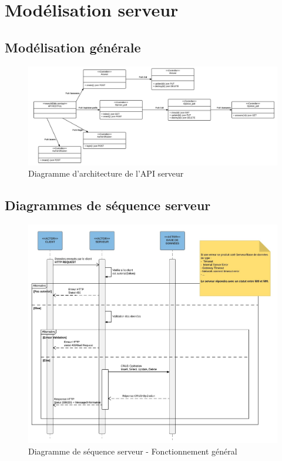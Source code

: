 \documentclass[titlepage]{report}
\begin{document}
\chapter{Modélisation serveur}

\section{Modélisation générale}

\begin{figure}[h]
	\caption{Diagramme d'architecture de l'API serveur}
	\label{annexe_diagramme_architectureAPI}
	\centering
	\includegraphics[width=\textwidth]{figures/diagrammes/architectureAPI.png}
\end{figure}

\clearpage
\section{Diagrammes de séquence serveur}

\begin{figure}[h]
	\caption{Diagramme de séquence serveur - Fonctionnement général}
	\label{annexe_diagramme_sequence_serveur}
	\centering
	\includegraphics[width=\textwidth]{figures/diagrammes/sequence_serveur.png}
\end{figure}
\end{document}
